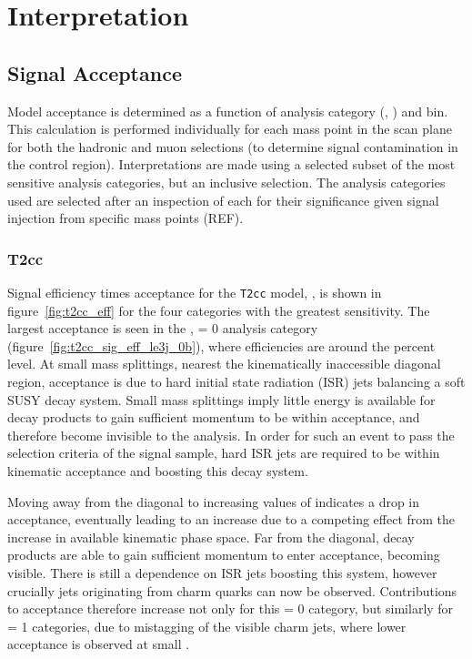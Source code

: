 \chapter{Interpretation}
\label{ch:9}

\ifpdf
    \graphicspath{{Chapter9/Figs/Raster/}{Chapter9/Figs/PDF/}{Chapter9/Figs/}}
\else
    \graphicspath{{Chapter9/Figs/Vector/}{Chapter9/Figs/}}
\fi

\section{Signal Acceptance}  %
\label{sec:interpretation_acceptance}

Model acceptance is determined as a function of analysis category (\nb, \nj) and
\HT bin. This calculation is performed individually for each mass point in the
scan plane for both the hadronic and muon selections (to determine 
signal contamination in the control region). Interpretations are made using a
selected subset of the most sensitive analysis 
categories, but an inclusive \HT selection. The analysis categories used are 
selected after an inspection of each for their significance given signal 
injection from specific mass points (REF).

\subsection{T2cc}
\label{sec:t2cc_eff}
Signal efficiency times acceptance for the \texttt{T2cc} model, \Ttwocc,  is shown in 
figure~\ref{fig:t2cc_eff} for the four categories with the greatest sensitivity.
The largest acceptance is seen in the \njlow, 
\nb= 0 analysis category (figure~\ref{fig:t2cc_sig_eff_le3j_0b}), where efficiencies
are around the percent level. At 
small mass splittings, nearest the kinematically inaccessible diagonal region, 
acceptance is due to hard initial state radiation (ISR) jets balancing a soft 
SUSY decay system. Small mass splittings imply little energy is available for 
decay products to gain sufficient momentum to be within acceptance, and therefore 
become invisible to the analysis. In order for such an event to pass the 
selection criteria of the signal sample, hard ISR jets are required to be within
kinematic acceptance and boosting this decay system.

Moving away from the 
diagonal to increasing values of \deltam indicates a drop in acceptance, 
eventually leading to an increase due to a competing effect from the increase in
available kinematic phase space. Far from the diagonal, decay products are able 
to gain sufficient momentum to enter acceptance, becoming visible. There
is still a dependence on ISR jets boosting this system, however crucially jets 
originating from charm quarks can now be observed. Contributions to acceptance
therefore increase not only for this \nb= 0 category, but similarly for \nb= 1
categories, due to mistagging of the visible charm jets, where lower
acceptance is observed at small \deltam.

